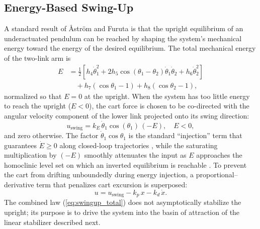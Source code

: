 \documentclass[conference]{IEEEtran}
\begin{document}
\subsection{Energy-Based Swing-Up}\label{ssec:swingup}
A standard result of \AA str\"om and Furuta \cite{astrom2000swingup} is that the upright equilibrium of an underactuated pendulum can be reached by shaping the system's mechanical energy toward the energy of the desired equilibrium. The total mechanical energy of the two-link arm is
\begin{align}
E &= \tfrac{1}{2}\!\left[h_4 \dot\theta_1^2 + 2 h_5\cos(\theta_1-\theta_2)\dot\theta_1\dot\theta_2 + h_6\dot\theta_2^2\right] \nonumber\\
&\quad + h_7\!\left(\cos\theta_1-1\right) + h_8\!\left(\cos\theta_2-1\right),
\label{eq:energy}
\end{align}
normalized so that $E=0$ at the upright. When the system has too little energy to reach the upright ($E<0$), the cart force is chosen to be co-directed with the angular velocity component of the lower link projected onto its swing direction:
\begin{equation}
u_{\text{swing}} = k_E\,\dot\theta_1\cos(\theta_1)\,(-E),\quad E<0,
\label{eq:uswing}
\end{equation}
and zero otherwise. The factor $\dot\theta_1\cos\theta_1$ is the standard ``injection'' term that guarantees $\dot E\ge 0$ along closed-loop trajectories \cite{astrom2000swingup,fantoni2002non}, while the saturating multiplication by $(-E)$ smoothly attenuates the input as $E$ approaches the homoclinic level set on which an inverted equilibrium is reachable \cite{lozano2000stabilization}. To prevent the cart from drifting unboundedly during energy injection, a proportional--derivative term that penalizes cart excursion is superposed:
\begin{equation}
u = u_{\text{swing}} - k_p\,x - k_d\,\dot x.
\label{eq:swingup_total}
\end{equation}
The combined law (\ref{eq:swingup_total}) does not asymptotically stabilize the upright; its purpose is to drive the system into the basin of attraction of the linear stabilizer described next.
\end{document}
